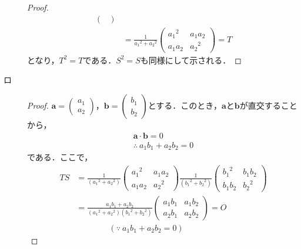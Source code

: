 \documentclass[uplatex,dvipdfmx,a4paper,10pt,fleqn]{jsarticle}
\begin{document}
\begin{leftbar}
\begin{description}
\begin{proof}
\begin{align*}
\begin{pmatrix}
        \end{pmatrix}
        \\
        &= \frac{1}{{a_1}^2+{a_2}^2}
        \begin{pmatrix}
            {a_1}^2 & a_1 a_2 \\
            a_1 a_2 & {a_2}^2
        \end{pmatrix}
        =T
    \end{align*}
    となり，$T^2=T$である．$S^2=S$も同様にして示される．
\end{proof}
\item[ロ]
    \begin{proof}
        $\bm{a}=
        \begin{pmatrix}
            a_1 \\
            a_2
        \end{pmatrix}
        $，$\bm{b}=
        \begin{pmatrix}
            b_1 \\
            b_2
        \end{pmatrix}
        $とする．このとき，$\bm{a}$と$\bm{b}$が直交することから，
        \begin{gather*}
            \bm{a} \cdot \bm{b}=0 \\
            \therefore ~a_1 b_1 + a_2 b_2 =0
        \end{gather*}
        である．ここで，
        \begin{align*}
            TS & = \frac{1}{({a_1}^2 +{a_2}^2)}
            \begin{pmatrix}
                {a_1}^2 & a_1 a_2 \\
                a_1 a_2 & {a_2}^2
            \end{pmatrix}
            \frac{1}{({b_1}^2 +{b_2}^2)}
            \begin{pmatrix}
                {b_1}^2 & b_1 b_2 \\
                b_1 b_2 & {b_2}^2
            \end{pmatrix}
            \\
            &=\frac{a_1 b_1 + a_2 b_2}{({a_1}^2 +{a_2}^2)({b_1}^2 +{b_2}^2)}
            \begin{pmatrix}
                a_1 b_1 & a_1 b_2 \\
                a_2 b_1 & a_2 b_2
            \end{pmatrix}
            =O \\
            & \qquad \qquad  (\because ~ a_1 b_1 + a_2 b_2 =0)
        \end{align*}

\end{proof}
\end{description}
\end{leftbar}
\end{document}
